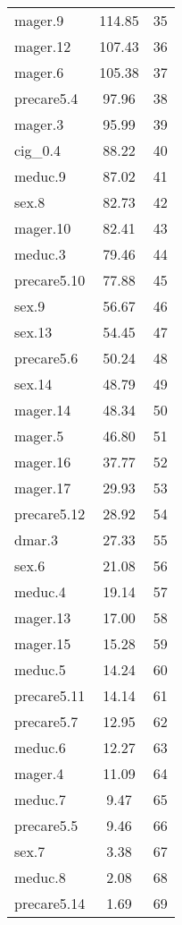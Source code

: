 \begin{longtable}{lcr}
mager.9 & 114.85 & 35 \\
mager.12 & 107.43 & 36 \\
mager.6 & 105.38 & 37 \\
precare5.4 & 97.96 & 38 \\
mager.3 & 95.99 & 39 \\
cig_0.4 & 88.22 & 40 \\
meduc.9 & 87.02 & 41 \\
sex.8 & 82.73 & 42 \\
mager.10 & 82.41 & 43 \\
meduc.3 & 79.46 & 44 \\
precare5.10 & 77.88 & 45 \\
sex.9 & 56.67 & 46 \\
sex.13 & 54.45 & 47 \\
precare5.6 & 50.24 & 48 \\
sex.14 & 48.79 & 49 \\
mager.14 & 48.34 & 50 \\
mager.5 & 46.80 & 51 \\
mager.16 & 37.77 & 52 \\
mager.17 & 29.93 & 53 \\
precare5.12 & 28.92 & 54 \\
dmar.3 & 27.33 & 55 \\
sex.6 & 21.08 & 56 \\
meduc.4 & 19.14 & 57 \\
mager.13 & 17.00 & 58 \\
mager.15 & 15.28 & 59 \\
meduc.5 & 14.24 & 60 \\
precare5.11 & 14.14 & 61 \\
precare5.7 & 12.95 & 62 \\
meduc.6 & 12.27 & 63 \\
mager.4 & 11.09 & 64 \\
meduc.7 & 9.47 & 65 \\
precare5.5 & 9.46 & 66 \\
sex.7 & 3.38 & 67 \\
meduc.8 & 2.08 & 68 \\
precare5.14 & 1.69 & 69 \\
\hline
\end{longtable}
\endgroup
